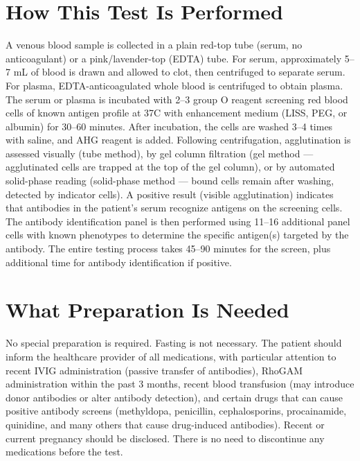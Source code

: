 \section*{How This Test Is Performed}
A venous blood sample is collected in a plain red-top tube (serum, no anticoagulant) or a pink/lavender-top (EDTA) tube. For serum, approximately 5--7 mL of blood is drawn and allowed to clot, then centrifuged to separate serum. For plasma, EDTA-anticoagulated whole blood is centrifuged to obtain plasma. The serum or plasma is incubated with 2--3 group O reagent screening red blood cells of known antigen profile at 37\textdegree{}C with enhancement medium (LISS, PEG, or albumin) for 30--60 minutes. After incubation, the cells are washed 3--4 times with saline, and AHG reagent is added. Following centrifugation, agglutination is assessed visually (tube method), by gel column filtration (gel method --- agglutinated cells are trapped at the top of the gel column), or by automated solid-phase reading (solid-phase method --- bound cells remain after washing, detected by indicator cells). A positive result (visible agglutination) indicates that antibodies in the patient's serum recognize antigens on the screening cells. The antibody identification panel is then performed using 11--16 additional panel cells with known phenotypes to determine the specific antigen(s) targeted by the antibody. The entire testing process takes 45--90 minutes for the screen, plus additional time for antibody identification if positive.

\section*{What Preparation Is Needed}
No special preparation is required. Fasting is not necessary. The patient should inform the healthcare provider of all medications, with particular attention to recent IVIG administration (passive transfer of antibodies), RhoGAM administration within the past 3 months, recent blood transfusion (may introduce donor antibodies or alter antibody detection), and certain drugs that can cause positive antibody screens (methyldopa, penicillin, cephalosporins, procainamide, quinidine, and many others that cause drug-induced antibodies). Recent or current pregnancy should be disclosed. There is no need to discontinue any medications before the test.

